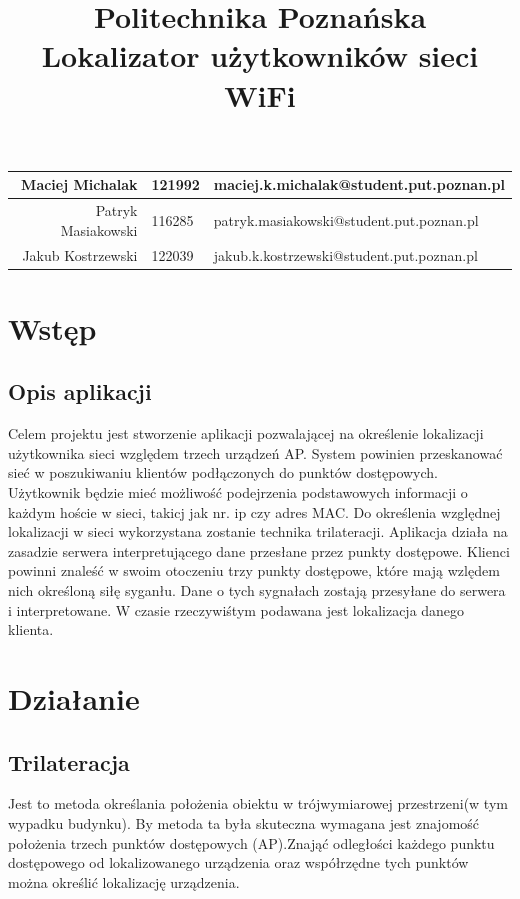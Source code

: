 \documentclass{article}
\begin{document}
	
	\title {Politechnika Poznańska \\Lokalizator użytkowników sieci WiFi }
	\maketitle
	\begin{tabular}{|r|l|l|} \hline
		Maciej Michalak & 121992 & maciej.k.michalak@student.put.poznan.pl \\
			\hline
		Patryk Masiakowski & 116285 & patryk.masiakowski@student.put.poznan.pl \\
			\hline
		Jakub Kostrzewski & 122039 & jakub.k.kostrzewski@student.put.poznan.pl \\
		\hline
	\end{tabular}
\newpage
\tableofcontents
\newpage
\listoffigures
\newpage
\section{Wstęp}
\subsection{Opis aplikacji}
Celem projektu jest stworzenie aplikacji pozwalającej na określenie lokalizacji użytkownika sieci względem trzech urządzeń AP. System powinien przeskanować sieć w poszukiwaniu klientów podłączonych do punktów dostępowych. Użytkownik będzie mieć możliwość podejrzenia podstawowych informacji o każdym hoście w sieci, takicj jak nr. ip czy adres MAC. Do określenia względnej lokalizacji w sieci wykorzystana zostanie technika trilateracji. Aplikacja działa na zasadzie serwera interpretującego dane przesłane przez punkty dostępowe. Klienci powinni znaleść w swoim otoczeniu trzy punkty dostępowe, które mają wzlędem nich określoną siłę syganłu. Dane o tych sygnałach zostają przesyłane do serwera i interpretowane. W czasie rzeczywiśtym podawana jest lokalizacja danego klienta. 


\section{Działanie}

\subsection{Trilateracja}
Jest to metoda określania położenia obiektu w trójwymiarowej przestrzeni(w tym wypadku budynku). By metoda ta była skuteczna wymagana jest znajomość położenia trzech punktów dostępowych (AP).Znająć odległości każdego punktu dostępowego od lokalizowanego urządzenia oraz współrzędne tych punktów można określić lokalizację urządzenia. 
\end{document}
